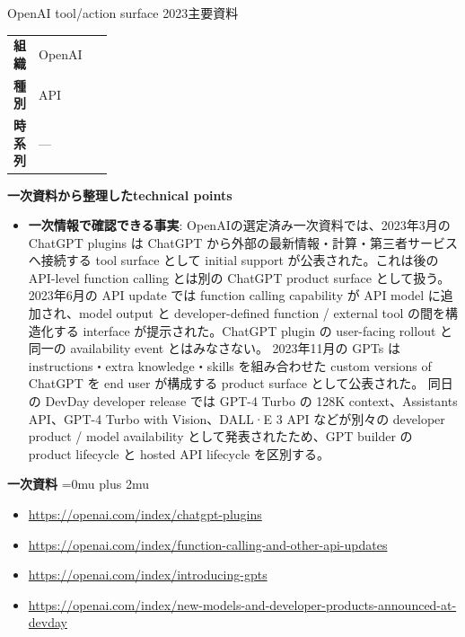 \begin{technicalnote}{OpenAI tool/action surface 2023}{主要資料}
\begingroup
\begin{tabularx}{\linewidth}{@{}>{\bfseries}p{0.22\linewidth}X@{}}
組織 & OpenAI \\
種別 & API \\
時系列 & — \\
\end{tabularx}
\smallskip
{\bfseries 一次資料から整理したtechnical points}
\begin{itemize}[leftmargin=1.5em,itemsep=0.35em]
\item \textbf{一次情報で確認できる事実}: OpenAIの選定済み一次資料では、2023年3月の ChatGPT plugins は ChatGPT から外部の最新情報・計算・第三者サービスへ接続する tool surface として initial support が公表された。これは後の API-level function calling とは別の ChatGPT product surface として扱う。 2023年6月の API update では function calling capability が API model に追加され、model output と developer-defined function / external tool の間を構造化する interface が提示された。ChatGPT plugin の user-facing rollout と同一の availability event とはみなさない。 2023年11月の GPTs は instructions・extra knowledge・skills を組み合わせた custom versions of ChatGPT を end user が構成する product surface として公表された。 同日の DevDay developer release では GPT-4 Turbo の 128K context、Assistants API、GPT-4 Turbo with Vision、DALL·E 3 API などが別々の developer product / model availability として発表されたため、GPT builder の product lifecycle と hosted API lifecycle を区別する。
\end{itemize}
\begin{minipage}{\linewidth}
\begin{samepage}
{\bfseries 一次資料}
\begingroup\sloppy
\Urlmuskip=0mu plus 2mu\relax
\begin{itemize}[leftmargin=1.5em,itemsep=0.25em]
\item {\scriptsize\url{https://openai.com/index/chatgpt-plugins}}
\item {\scriptsize\url{https://openai.com/index/function-calling-and-other-api-updates}}
\item {\scriptsize\url{https://openai.com/index/introducing-gpts}}
\item {\scriptsize\url{https://openai.com/index/new-models-and-developer-products-announced-at-devday}}
\end{itemize}
\endgroup
\end{samepage}
\end{minipage}
\endgroup
\end{technicalnote}
\medskip

